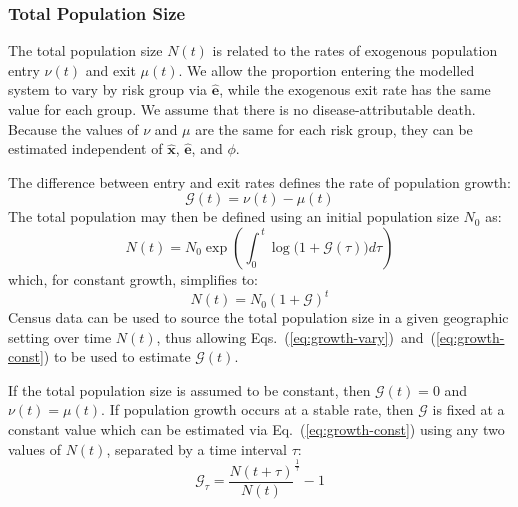 \subsubsection{Total Population Size}\label{sss:params-nu-mu}
The total population size $N(t)$ is related to
the rates of exogenous population entry $\nu(t)$ and exit $\mu(t)$.  %
We allow the proportion entering the modelled system to vary by risk group via $\bm{\hat{e}}$,
while the exogenous exit rate has the same value for each group. %
We assume that there is no disease-attributable death.
Because the values of $\nu$ and $\mu$ are the same for each risk group, 
they can be estimated independent of
$\bm{\hat{x}}$, $\bm{\hat{e}}$, and $\phi$.
\par
The difference between entry and exit rates
defines the rate of population growth:
\begin{equation}\label{eq:growth-G}
\mathcal{G}(t) = \nu(t) - \mu(t) 
\end{equation}
The total population may then be defined using an initial population size $N_0$ as:
\begin{equation}\label{eq:growth-vary}
  N(t) = N_0 \exp{\left(\int_{0}^{\,t}{\log\big(1+\mathcal{G}(\tau) \big)d\tau}\right)}
\end{equation}
which, for constant growth, simplifies to:   %
\begin{equation} \label{eq:growth-const}
  N(t) = N_0 {(1 + \mathcal{G})}^{t}
\end{equation}
Census data can be used to source the total population size in a given geographic setting over time $N(t)$,  %
thus allowing Eqs.~(\ref{eq:growth-vary})~and~(\ref{eq:growth-const})
to be used to estimate $\mathcal{G}(t)$.
\par
If the total population size is assumed to be constant, then $\mathcal{G}(t) = 0$ and $\nu(t) = \mu(t)$.
If population growth occurs at a stable rate, then 
$\mathcal{G}$ is fixed at a constant value
which can be estimated via Eq.~(\ref{eq:growth-const})
using any two values of $N(t)$, separated by a time interval $\tau$:
\begin{equation}
\mathcal{G}_{\tau} = {\frac{N(t+\tau)}{N(t)}}^{\frac{1}{\tau}} -1
\end{equation}

